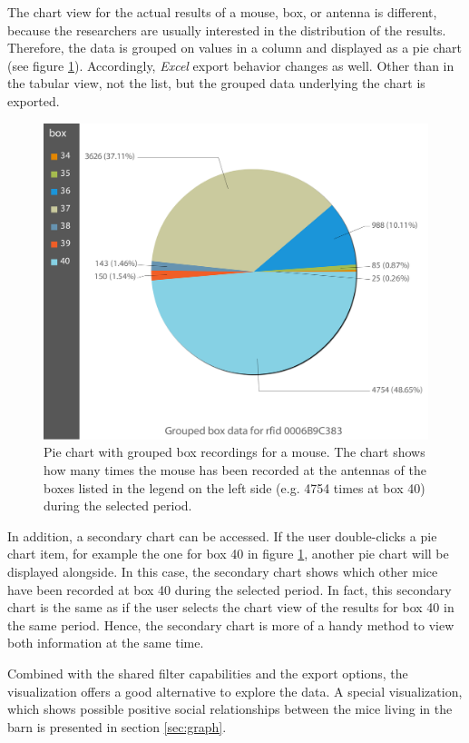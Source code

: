 The chart view for the actual results of a mouse, box, or antenna is different, because the researchers are usually interested in the distribution of the results. Therefore, the data is grouped on values in a column and displayed as a pie chart (see figure \ref{fig:pie_chart_for_mouse}). Accordingly, \textit{Excel} export behavior changes as well. Other than in the tabular view, not the list, but the grouped data underlying the chart is exported.

\begin{figure}[htbp]
\begin{center}
  \includegraphics[width=.66\textwidth]{assets/img/pie_chart_for_mouse.png}
  \caption[Pie chart of result data for a mouse]{Pie chart with grouped box recordings for a mouse. The chart shows how many times the mouse has been recorded at the antennas of the boxes listed in the legend on the left side (e.g. 4754 times at box 40) during the selected period.}
  \label{fig:pie_chart_for_mouse}
\end{center}
\end{figure}

In addition, a secondary chart can be accessed. If the user double-clicks a pie chart item, for example the one for box 40 in figure \ref{fig:pie_chart_for_mouse}, another pie chart will be displayed alongside. In this case, the secondary chart shows which other mice have been recorded at box 40 during the selected period. In fact, this secondary chart is the same as if the user selects the chart view of the results for box 40 in the same period. Hence, the secondary chart is more of a handy method to view both information at the same time.

Combined with the shared filter capabilities and the export options, the visualization offers a good alternative to explore the data. A special visualization, which shows possible positive social relationships between the mice living in the barn is presented in section \ref{sec:graph}.

